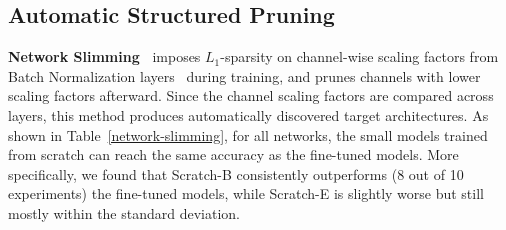 \subsection{Automatic Structured Pruning}



\textbf{Network Slimming~\cite{liu2017learning}}
 imposes $L_1$-sparsity on channel-wise scaling factors from Batch Normalization layers~\cite{bn} during training, and prunes channels with lower scaling factors afterward. Since the channel scaling factors are compared across layers, this method produces automatically discovered target architectures. As shown in Table~\ref{network-slimming}, for all networks, the small models trained from scratch can reach the same accuracy as the fine-tuned models. More specifically, we found that Scratch-B consistently outperforms (8 out of 10 experiments) the fine-tuned models, while Scratch-E is slightly worse but still mostly within the standard deviation.
 
